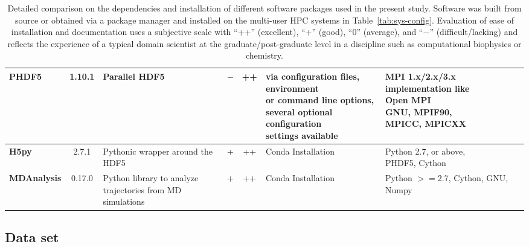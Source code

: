 \begin{table}[ht!]
\begin{adjustbox}{max width=\textwidth}
\begin{tabular}{l c l c c l l}
   \midrule
   \bfseries PHDF5 & 1.10.1 & Parallel HDF5 & $-$ & ++ & \makecell[l]{via configuration files,\\ environment \\or command line options, \\ several optional configuration\\ settings available} &\makecell[l]{MPI 1.x/2.x/3.x  \\ implementation like \\ Open MPI  \\GNU, MPIF90,  \\MPICC, MPICXX}\\
   \midrule
   \bfseries H5py &  2.7.1 & Pythonic wrapper around the HDF5 & + & ++ & Conda Installation & \makecell[l]{Python 2.7, or above,\\ PHDF5, Cython}\\    
   \midrule
   \bfseries MDAnalysis & 0.17.0 & \makecell[l]{Python library to analyze \\trajectories from MD simulations} & + & ++ & Conda Installation & \makecell[l]{Python $>=$2.7, Cython,\\ GNU, Numpy}\\
  \bottomrule
\end{tabular}
\end{adjustbox}
\caption[Version of the packages used in the present study]%
{Detailed comparison on the dependencies and installation of different software packages used in the present study. Software was built from source or obtained via a package manager and installed on the multi-user HPC systems in Table~\protect\ref{tab:sys-config}. Evaluation of ease of installation and documentation uses a subjective scale with ``++'' (excellent), ``+'' (good), ``0'' (average), and ``$-$'' (difficult/lacking) and reflects the experience of a typical domain scientist at the graduate/post-graduate level in a discipline such as computational biophysics or chemistry.}
\label{tab:version}
\end{table}


\subsection{Data set}
\label{sec:data}

